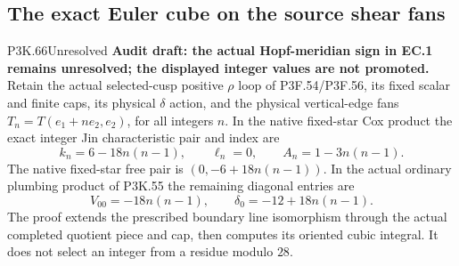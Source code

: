 \subsection{The exact Euler cube on the source shear fans}
\begin{statement}{P3K.66}{Unresolved}
\textbf{Audit draft: the actual Hopf-meridian sign in EC.1 remains unresolved; the displayed integer values are not promoted.} Retain the actual selected-cusp positive \(\rho\) loop of
P3F.54/P3F.56, its fixed scalar and finite caps, its physical \(\delta\)
action, and the physical vertical-edge fans
\(T_n=T(e_1+ne_2,e_2)\), for all integers \(n\).
In the native fixed-star Cox product the exact integer Jin
characteristic pair and index are
\[
 k_n=6-18n(n-1),\qquad \ell_n=0,\qquad
 A_n=1-3n(n-1).
\]
The native fixed-star free pair is
\((0,-6+18n(n-1))\). In the actual ordinary plumbing product of
P3K.55 the remaining diagonal entries are
\[
 V_{00}=-18n(n-1),\qquad
 \delta_0=-12+18n(n-1).
\]
The proof extends the prescribed boundary line isomorphism through
the actual completed quotient piece and cap, then computes its
oriented cubic integral. It does not select an integer from a
residue modulo \(28\).
\end{statement}

